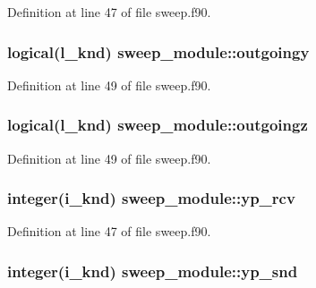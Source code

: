 Definition at line 47 of file sweep.\-f90.

\hypertarget{classsweep__module_a951a915875e576860980173b5ae9f23d}{
\subsubsection[{outgoingy}]{\setlength{\rightskip}{0pt plus 5cm}logical(l\-\_\-knd) sweep\-\_\-module\-::outgoingy\hspace{0.3cm}{\ttfamily [private]}}}\label{classsweep__module_a951a915875e576860980173b5ae9f23d}


Definition at line 49 of file sweep.\-f90.

\hypertarget{classsweep__module_a219e782e7e79e82858addb91583fcae8}{
\subsubsection[{outgoingz}]{\setlength{\rightskip}{0pt plus 5cm}logical(l\-\_\-knd) sweep\-\_\-module\-::outgoingz\hspace{0.3cm}{\ttfamily [private]}}}\label{classsweep__module_a219e782e7e79e82858addb91583fcae8}


Definition at line 49 of file sweep.\-f90.

\hypertarget{classsweep__module_a709eb6789a39f6937645ba7022192e99}{
\subsubsection[{yp\-\_\-rcv}]{\setlength{\rightskip}{0pt plus 5cm}integer(i\-\_\-knd) sweep\-\_\-module\-::yp\-\_\-rcv\hspace{0.3cm}{\ttfamily [private]}}}\label{classsweep__module_a709eb6789a39f6937645ba7022192e99}


Definition at line 47 of file sweep.\-f90.

\hypertarget{classsweep__module_a1aab688bcb2aaa33a5bf60e57385d575}{
\subsubsection[{yp\-\_\-snd}]{\setlength{\rightskip}{0pt plus 5cm}integer(i\-\_\-knd) sweep\-\_\-module\-::yp\-\_\-snd\hspace{0.3cm}{\ttfamily [private]}}}\label{classsweep__module_a1aab688bcb2aaa33a5bf60e57385d575}



